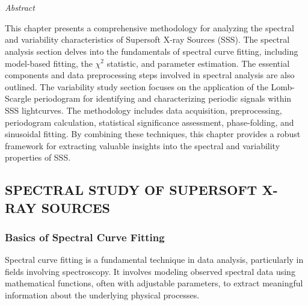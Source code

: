 \chapter{\MakeUppercase{\ChapterTitleTwo}} \label{chap:methodology}
    \minitoc
    
    \newpage
    \begin{center}
    	\emph{Abstract}
    \end{center}
    
    This chapter presents a comprehensive methodology for analyzing the spectral and variability characteristics of Supersoft X-ray Sources (SSS). The spectral analysis section delves into the fundamentals of spectral curve fitting, including model-based fitting, the $\chi^2$ statistic, and parameter estimation. The essential components and data preprocessing steps involved in spectral analysis are also outlined. The variability study section focuses on the application of the Lomb-Scargle periodogram for identifying and characterizing periodic signals within SSS lightcurves. The methodology includes data acquisition, preprocessing, periodogram calculation, statistical significance assessment, phase-folding, and sinusoidal fitting. By combining these techniques, this chapter provides a robust framework for extracting valuable insights into the spectral and variability properties of SSS.
    
    \setcounter{footnote}{\value{footnotecount}}
    
    \newpage
    \section{\MakeUppercase{Spectral Study of Supersoft X-ray Sources}} \label{methodology:spectral}
    	
    	\subsection{Basics of Spectral Curve Fitting}
    		Spectral curve fitting is a fundamental technique in data analysis, particularly in fields involving spectroscopy. It involves modeling observed spectral data using mathematical functions, often with adjustable parameters, to extract meaningful information about the underlying physical processes.

